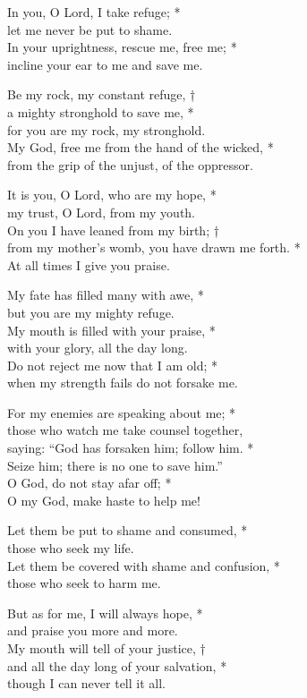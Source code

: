 In you, O Lord, I take refuge; *\\
let me never be put to shame. \\
In your uprightness, rescue me, free me; *\\
incline your ear to me and save me. 

Be my rock, my constant refuge, †\\
a mighty stronghold to save me, *\\
for you are my rock, my stronghold. \\
My God, free me from the hand of the wicked, *\\
from the grip of the unjust, of the oppressor. 

It is you, O Lord, who are my hope, *\\
my trust, O Lord, from my youth. \\
On you I have leaned from my birth; †\\
from my mother's womb, you have drawn me forth. *\\
At all times I give you praise. 

My fate has filled many with awe, *\\
but you are my mighty refuge. \\
My mouth is filled with your praise, *\\
with your glory, all the day long. \\
Do not reject me now that I am old; *\\
when my strength fails do not forsake me. 

For my enemies are speaking about me; *\\
those who watch me take counsel together, \\
saying: ``God has forsaken him; follow him. *\\ 
Seize him; there is no one to save him.'' \\
O God, do not stay afar off; *\\
O my God, make haste to help me! 

Let them be put to shame and consumed, *\\
those who seek my life. \\
Let them be covered with shame and confusion, *\\
those who seek to harm me. 

But as for me, I will always hope, *\\
and praise you more and more. \\
My mouth will tell of your justice, †\\
and all the day long of your salvation, *\\
though I can never tell it all. 

